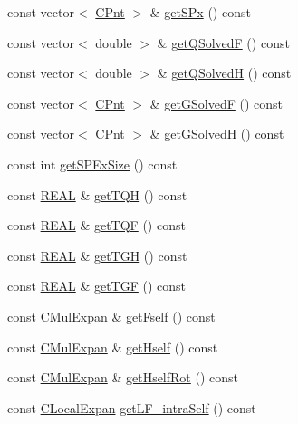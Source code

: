 \begin{DoxyCompactItemize}
const vector$<$ \hyperlink{classCPnt}{C\-Pnt} $>$ \& \hyperlink{classCSolExpCenter_a25760cb1d325b99f3bd80cb1d5c0b117}{get\-S\-Px} () const 
\item 
const vector$<$ double $>$ \& \hyperlink{classCSolExpCenter_ac015a460a744ed6e090493f6ce7871f4}{get\-Q\-Solved\-F} () const 
\item 
const vector$<$ double $>$ \& \hyperlink{classCSolExpCenter_a5b205aa4af4aa340561e9fa85c427178}{get\-Q\-Solved\-H} () const 
\item 
const vector$<$ \hyperlink{classCPnt}{C\-Pnt} $>$ \& \hyperlink{classCSolExpCenter_af8f37caa51303722d0610b09c1a2b7af}{get\-G\-Solved\-F} () const 
\item 
const vector$<$ \hyperlink{classCPnt}{C\-Pnt} $>$ \& \hyperlink{classCSolExpCenter_ab67e165e1ca5d2cf386174cca36d6249}{get\-G\-Solved\-H} () const 
\item 
const int \hyperlink{classCSolExpCenter_a16443b8957561090a95c0e7c5731ea35}{get\-S\-P\-Ex\-Size} () const 
\item 
const \hyperlink{util_8h_a5821460e95a0800cf9f24c38915cbbde}{R\-E\-A\-L} \& \hyperlink{classCSolExpCenter_a327f1f62a10a5e49b2683188bd558e4f}{get\-T\-Q\-H} () const 
\item 
const \hyperlink{util_8h_a5821460e95a0800cf9f24c38915cbbde}{R\-E\-A\-L} \& \hyperlink{classCSolExpCenter_aa56891d92865c4fdc947b21351064c46}{get\-T\-Q\-F} () const 
\item 
const \hyperlink{util_8h_a5821460e95a0800cf9f24c38915cbbde}{R\-E\-A\-L} \& \hyperlink{classCSolExpCenter_a9518962ce79f25e7ec58d608e0af9afe}{get\-T\-G\-H} () const 
\item 
const \hyperlink{util_8h_a5821460e95a0800cf9f24c38915cbbde}{R\-E\-A\-L} \& \hyperlink{classCSolExpCenter_a9640ddf1bb2d053c0c4cbf20f323839b}{get\-T\-G\-F} () const 
\item 
const \hyperlink{classCMulExpan}{C\-Mul\-Expan} \& \hyperlink{classCSolExpCenter_a8c78ad99d4f703f8b6132be9fe256774}{get\-Fself} () const 
\item 
const \hyperlink{classCMulExpan}{C\-Mul\-Expan} \& \hyperlink{classCSolExpCenter_a3e6d7462d7b84de1fc77836e8755a887}{get\-Hself} () const 
\item 
const \hyperlink{classCMulExpan}{C\-Mul\-Expan} \& \hyperlink{classCSolExpCenter_a50527955349dcd9a5e86f3172eefdb2e}{get\-Hself\-Rot} () const 
\item 
const \hyperlink{classCLocalExpan}{C\-Local\-Expan} \hyperlink{classCSolExpCenter_a285cd7dd7d643d68e227793ccc21a668}{get\-L\-F\-\_\-intra\-Self} () const 

\end{DoxyCompactItemize}

